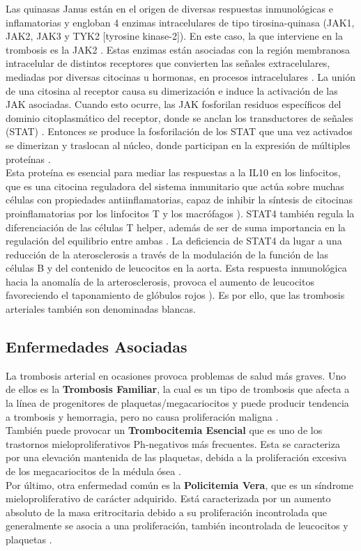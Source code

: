 		Las quinasas Janus están en el origen de diversas respuestas inmunológicas e inflamatorias y engloban 4 enzimas intracelulares de tipo tirosina-quinasa (JAK1, JAK2, JAK3 y TYK2 [tyrosine kinase-2]). En este caso, la que interviene en la trombosis es la JAK2 \cite{JAK2}. Estas enzimas están asociadas con la región membranosa intracelular de distintos receptores que convierten las señales extracelulares, mediadas por diversas citocinas u hormonas, en procesos intracelulares \cite{JAK2}. La unión de una citosina al receptor causa su dimerización e induce la activación de las JAK asociadas. Cuando esto ocurre, las JAK fosforilan residuos específicos del dominio citoplasmático del receptor, donde se anclan los transductores de señales (STAT) \cite{JAK2}. Entonces se produce la fosforilación de los STAT que una vez activados se dimerizan y traslocan al núcleo, donde participan en la expresión de múltiples proteínas \cite{JAK2} \cite{STAT4}.\\
		
		Esta proteína es esencial para mediar las respuestas a la IL10 en los linfocitos, que es una citocina reguladora del sistema inmunitario que actúa sobre muchas células con propiedades antiinflamatorias, capaz de inhibir la síntesis de citocinas proinflamatorias por los linfocitos T y los macrófagos \cite{IL10}). STAT4 también regula la diferenciación de las células T helper, además de ser de suma importancia en la regulación del equilibrio entre ambas \cite{STAT4} . La deficiencia de STAT4 da lugar a una reducción de la aterosclerosis a través de la modulación de la función de las células B y del contenido de leucocitos en la aorta. Esta respuesta inmunológica hacia la anomalía de la arterosclerosis, provoca el aumento de leucocitos favoreciendo el taponamiento de glóbulos rojos \cite{STAT4}). Es por ello, que las trombosis arteriales también son denominadas blancas.\\

	
	

\subsection{Enfermedades Asociadas}
La trombosis arterial en ocasiones provoca problemas de salud más graves. Uno de ellos es la \textbf{Trombosis Familiar}, la cual es un tipo de trombosis que afecta a la línea de progenitores de plaquetas/megacariocitos y puede producir tendencia a trombosis y hemorragia, pero no causa proliferación maligna \cite{Trombocitosis_Familiar}.\\
También puede provocar un \textbf{Trombocitemia Esencial} que  es uno de los trastornos mieloproliferativos Ph-negativos más frecuentes. Esta se caracteriza por una elevación mantenida de las plaquetas, debida a la proliferación excesiva de los megacariocitos de la médula ósea \cite{Trombocitema_Esencial}.\\
Por último, otra enfermedad común es la \textbf{Policitemia Vera}, que es un síndrome mieloproliferativo de carácter adquirido. Está caracterizada por un aumento absoluto de la masa eritrocitaria debido a su proliferación incontrolada que generalmente se asocia a una proliferación, también incontrolada de leucocitos y plaquetas \cite{Policitema_Vera}.

